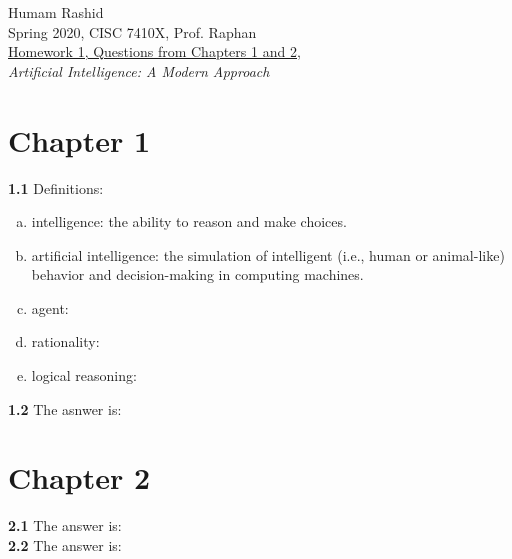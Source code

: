 \documentclass{scrartcl}
\begin{document}
\begin{flushleft}
Humam Rashid\\
Spring 2020, CISC 7410X, Prof. Raphan\\
\underline{Homework 1, Questions from Chapters 1 and 2,}\\
\textit{Artificial Intelligence: A Modern Approach}
\end{flushleft}

\section*{Chapter 1}
\textbf{1.1} Definitions:
\begin{enumerate}[(a)]
    \item intelligence: the ability to reason and make choices.
    \item artificial intelligence: the simulation of intelligent (i.e., human or animal-like)
        behavior and decision-making in computing machines.
    \item agent:
    \item rationality:
    \item logical reasoning:
\end{enumerate}
\textbf{1.2} The asnwer is:

\section*{Chapter 2}
\textbf{2.1} The answer is:
\\
\textbf{2.2} The answer is:
\end{document}
